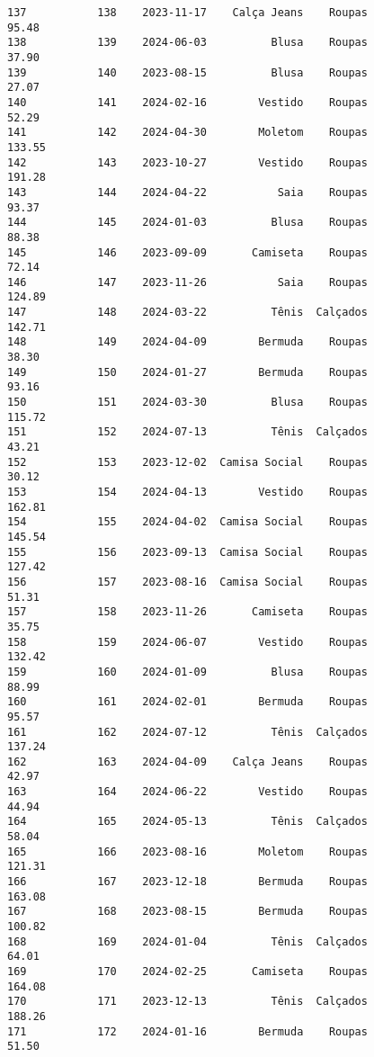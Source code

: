 \documentclass[11pt]{article}
\begin{document}
\begin{Verbatim}[commandchars=\\\{\}]
137           138    2023-11-17    Calça Jeans    Roupas           95.48   
138           139    2024-06-03          Blusa    Roupas           37.90   
139           140    2023-08-15          Blusa    Roupas           27.07   
140           141    2024-02-16        Vestido    Roupas           52.29   
141           142    2024-04-30        Moletom    Roupas          133.55   
142           143    2023-10-27        Vestido    Roupas          191.28   
143           144    2024-04-22           Saia    Roupas           93.37   
144           145    2024-01-03          Blusa    Roupas           88.38   
145           146    2023-09-09       Camiseta    Roupas           72.14   
146           147    2023-11-26           Saia    Roupas          124.89   
147           148    2024-03-22          Tênis  Calçados          142.71   
148           149    2024-04-09        Bermuda    Roupas           38.30   
149           150    2024-01-27        Bermuda    Roupas           93.16   
150           151    2024-03-30          Blusa    Roupas          115.72   
151           152    2024-07-13          Tênis  Calçados           43.21   
152           153    2023-12-02  Camisa Social    Roupas           30.12   
153           154    2024-04-13        Vestido    Roupas          162.81   
154           155    2024-04-02  Camisa Social    Roupas          145.54   
155           156    2023-09-13  Camisa Social    Roupas          127.42   
156           157    2023-08-16  Camisa Social    Roupas           51.31   
157           158    2023-11-26       Camiseta    Roupas           35.75   
158           159    2024-06-07        Vestido    Roupas          132.42   
159           160    2024-01-09          Blusa    Roupas           88.99   
160           161    2024-02-01        Bermuda    Roupas           95.57   
161           162    2024-07-12          Tênis  Calçados          137.24   
162           163    2024-04-09    Calça Jeans    Roupas           42.97   
163           164    2024-06-22        Vestido    Roupas           44.94   
164           165    2024-05-13          Tênis  Calçados           58.04   
165           166    2023-08-16        Moletom    Roupas          121.31   
166           167    2023-12-18        Bermuda    Roupas          163.08   
167           168    2023-08-15        Bermuda    Roupas          100.82   
168           169    2024-01-04          Tênis  Calçados           64.01   
169           170    2024-02-25       Camiseta    Roupas          164.08   
170           171    2023-12-13          Tênis  Calçados          188.26   
171           172    2024-01-16        Bermuda    Roupas           51.50   

\end{Verbatim}
\end{document}
